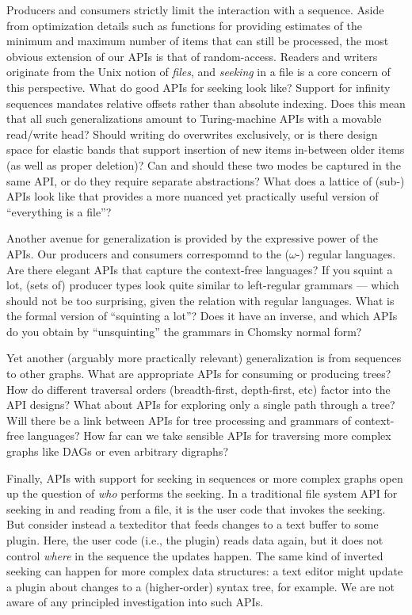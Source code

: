 \documentclass[sigplan,screen,10pt,review]{acmart}
\begin{document}
Producers and consumers strictly limit the interaction with a sequence. Aside from optimization details such as functions for providing estimates of the minimum and maximum number of items that can still be processed, the most obvious extension of our APIs is that of random-access. Readers and writers originate from the Unix notion of \textit{files}, and \textit{seeking} in a file is a core concern of this perspective. What do good APIs for seeking look like? Support for infinity sequences mandates relative offsets rather than absolute indexing. Does this mean that all such generalizations amount to Turing-machine APIs with a movable read/write head? Should writing do overwrites exclusively, or is there design space for elastic bands that support insertion of new items in-between older items (as well as proper deletion)? Can and should these two modes be captured in the same API, or do they require separate abstractions? What does a lattice of (sub-) APIs look like that provides a more nuanced yet practically useful version of ``everything is a file''?

Another avenue for generalization is provided by the expressive power of the APIs. Our producers and consumers correspomnd to the ($\omega$-) regular languages. Are there elegant APIs that capture the context-free languages? If you squint a lot, (sets of) producer types look quite similar to left-regular grammars --- which should not be too surprising, given the relation with regular languages. What is the formal version of ``squinting a lot''? Does it have an inverse, and which APIs do you obtain by ``unsquinting'' the grammars in Chomsky normal form?

Yet another (arguably more practically relevant) generalization is from sequences to other graphs. What are appropriate APIs for consuming or producing trees? How do different traversal orders (breadth-first, depth-first, etc) factor into the API designs? What about APIs for exploring only a single path through a tree? Will there be a link between APIs for tree processing and grammars of context-free languages? How far can we take sensible APIs for traversing more complex graphs like DAGs or even arbitrary digraphs?

Finally, APIs with support for seeking in sequences or more complex graphs open up the question of \textit{who} performs the seeking. In a traditional file system API for seeking in and reading from a file, it is the user code that invokes the seeking. But consider instead a texteditor that feeds changes to a text buffer to some plugin. Here, the user code (i.e., the plugin) reads data again, but it does not control \textit{where} in the sequence the updates happen. The same kind of inverted seeking can happen for more complex data structures: a text editor might update a plugin about changes to a (higher-order) syntax tree, for example. We are not aware of any principled investigation into such APIs.
\end{document}
